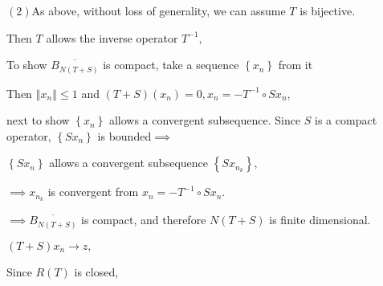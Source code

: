 \documentclass{article}
\begin{document}
$\left( 2\right) $As above, without loss of generality, we can assume $T$ is
bijective.

Then $T$ allows the inverse operator $T^{-1},$

To show $\overline{B_{N\left( T+S\right) }}$ is compact, take a sequence $%
\left\{ x_{n}\right\} $ from it

Then $\left\Vert x_{n}\right\Vert \leq 1$ and $\left( T+S\right) \left(
x_{n}\right) =0,x_{n}=-T^{-1}\circ Sx_{n},$

next to show $\left\{ x_{n}\right\} $ allows a convergent subsequence. Since 
$S$ is a compact operator, $\left\{ Sx_{n}\right\} $ is bounded$\implies $

$\left\{ Sx_{n}\right\} $ allows a convergent subsequence $\left\{
Sx_{n_{k}}\right\} ,$

\bigskip $\implies x_{n_{k}}$ is convergent from $x_{n}=-T^{-1}\circ Sx_{n}.$

$\implies \overline{B_{N\left( T+S\right) }}$ is compact, and therefore $%
N\left( T+S\right) $ is finite dimensional.

$\left( T+S\right) x_{n}\rightarrow z,$

Since $R\left( T\right) $ is closed, 
\end{document}
